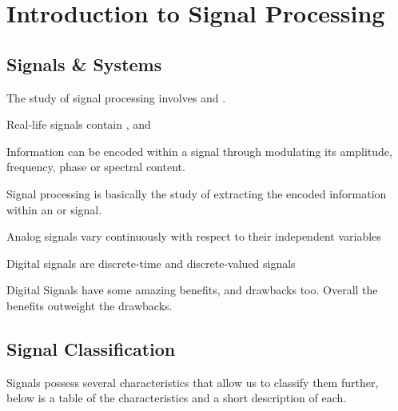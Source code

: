 \chapter{Introduction to Signal Processing}

\section{Signals \& Systems}

The study of signal processing involves  and .
\begin{bullets}
	\item Real-life signals contain , and 
	\item Information can be encoded within a signal through modulating its amplitude, frequency, phase or spectral content.
\end{bullets}

Signal processing is basically the study of extracting the encoded information within an  or  signal.
\begin{bullets}
	\item Analog signals vary continuously with respect to their independent variables
	\item Digital signals are discrete-time and discrete-valued signals
\end{bullets}

Digital Signals have some amazing benefits, and drawbacks too. Overall the benefits outweight the drawbacks.

\section{Signal Classification}
Signals possess several characteristics that allow us to classify them further, below is a table of the characteristics and a short description of each.

